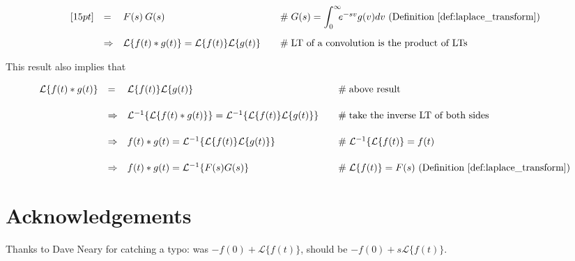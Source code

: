 \documentclass{article}
\theoremstyle{definition}
\begin{document}
\begin{equation*}
\begin{array}{lllll}
[15pt]
&=& F(s)\:G(s)                                                                                                                   &\quad \mathrel{\#} G(s) = \mathlarger{\int}^\infty_0 \!\! e^{-sv}  g(v) dv \text{ (Definition \ref{def:laplace_transform})}      \\   
[15pt]
&\Rightarrow& \mathcal{L}\{f(t) \ast g(t)\} = \mathcal{L}\{f(t)\}\mathcal{L}\{g(t)\}                                        &\quad \mathrel{\#} \text{LT of a convolution is the product of LTs}                                                            \\
\end{array}
\end{equation*}

\bigskip
\bigskip
\noindent
This result also implies that

\bigskip
\begin{equation*}
\begin{array}{lllll}
\mathcal{L}\{f(t) \ast g(t)\} 
&=& \mathcal{L}\{f(t)\}\mathcal{L}\{g(t)\}                                                                                                                               &\quad \mathrel{\#} \text{above result}                                      \\
[15pt]
&\Rightarrow& \mathcal{L}^{-1}\{\mathcal{L}\{f(t) \ast g(t)\}\} =  \mathcal{L}^{-1}\{\mathcal{L}\{f(t)\}\mathcal{L}\{g(t)\}\}     &\quad \mathrel{\#} \text{take the inverse LT of both sides}       \\
[15pt]
&\Rightarrow& f(t) \ast g(t) =  \mathcal{L}^{-1}\{\mathcal{L}\{f(t)\}\mathcal{L}\{g(t)\}\}                                                          &\quad \mathrel{\#}   \mathcal{L}^{-1}\{\mathcal{L}\{f(t)\} = f(t)  \\
[15pt]
&\Rightarrow& f(t) \ast g(t) =  \mathcal{L}^{-1}\{F(s) G(s)\}                                                                                                  &\quad \mathrel{\#} \text{$\mathcal{L}\{f(t)\} = F(s)$ (Definition \ref{def:laplace_transform})}
\end{array}
\end{equation*}


\bigskip
\section*{Acknowledgements}
Thanks to Dave Neary for catching a typo: was $-f(0) + \mathcal{L}\{f(t)\}$, should be $-f(0) + s \mathcal{L}\{f(t)\} $.

\newpage


\end{document}
